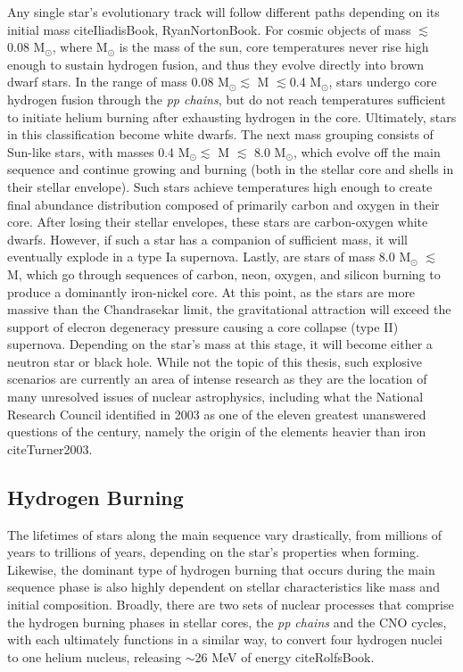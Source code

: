 Any single star's evolutionary track will follow different paths depending on its initial mass cite{IliadisBook, RyanNortonBook}.  For cosmic objects of mass $\lesssim$ 0.08 M$_{\odot}$, where M$_{\odot}$ is the mass of the sun, core temperatures never rise high enough to sustain hydrogen fusion, and thus they evolve directly into brown dwarf stars. In the range of mass 0.08 M$_{\odot} \lesssim$ M $\lesssim$0.4 M$_{\odot}$, stars undergo core hydrogen fusion through the \textit{pp chains}, but do not reach temperatures sufficient to initiate helium burning after exhausting hydrogen in the core. Ultimately, stars in this classification become white dwarfs. The next mass grouping consists of Sun-like stars, with masses 0.4 M$_{\odot} \lesssim$ M $\lesssim$ 8.0 M$_{\odot}$, which evolve off the main sequence and continue growing and burning (both in the stellar core and shells in their stellar envelope). Such stars achieve temperatures high enough to create final abundance distribution composed of primarily carbon and oxygen in their core. After losing their stellar envelopes, these stars are carbon-oxygen white dwarfs. However, if such a star has a companion of sufficient mass, it will eventually explode in a type Ia supernova. Lastly, are stars of mass 8.0 M$_{\odot}$ $\lesssim$ M, which go through sequences of carbon, neon, oxygen, and silicon burning to produce a dominantly iron-nickel core. At this point, as the stars are more massive than the Chandrasekar limit, the gravitational attraction will exceed the support of elecron degeneracy pressure causing a core collapse (type II) supernova. Depending on the star's mass at this stage, it will become either a neutron star or black hole. While not the topic of this thesis, such explosive scenarios are currently an area of intense research as they are the location of many unresolved issues of nuclear astrophysics, including what the National Research Council identified in 2003 as one of the eleven greatest unanswered questions of the century, namely the origin of the elements heavier than iron cite{Turner2003}.


\subsection{Hydrogen Burning}

The lifetimes of stars along the main sequence vary drastically, from millions of years to trillions of years, depending on the star's properties when forming. Likewise, the dominant type of hydrogen burning that occurs during the main sequence phase is also highly dependent on stellar characteristics like mass and initial composition. Broadly, there are two sets of nuclear processes that comprise the hydrogen burning phases in stellar cores, the \textit{pp chains} and the CNO cycles, with each ultimately functions in a similar way, to convert four hydrogen nuclei to one helium nucleus, releasing $ \sim$26 MeV of energy cite{RolfsBook}. 

